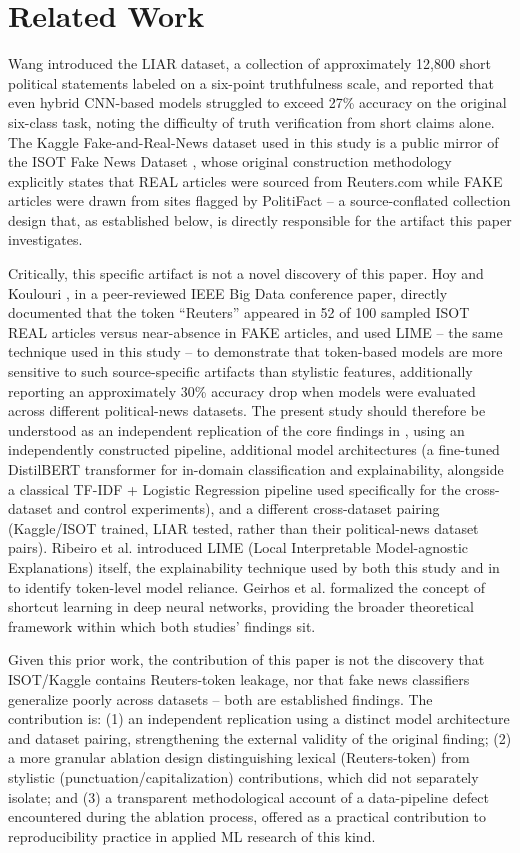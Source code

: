 \documentclass[conference]{IEEEtran}
\begin{document}
\section{Related Work}
Wang \cite{wang2017} introduced the LIAR dataset, a collection of approximately 12,800 short political statements labeled on a six-point truthfulness scale, and reported that even hybrid CNN-based models struggled to exceed 27\% accuracy on the original six-class task, noting the difficulty of truth verification from short claims alone. The Kaggle Fake-and-Real-News dataset used in this study is a public mirror of the ISOT Fake News Dataset \cite{ahmed2017}, whose original construction methodology explicitly states that REAL articles were sourced from Reuters.com while FAKE articles were drawn from sites flagged by PolitiFact -- a source-conflated collection design that, as established below, is directly responsible for the artifact this paper investigates.

Critically, this specific artifact is not a novel discovery of this paper. Hoy and Koulouri \cite{hoy2022}, in a peer-reviewed IEEE Big Data conference paper, directly documented that the token ``Reuters'' appeared in 52 of 100 sampled ISOT REAL articles versus near-absence in FAKE articles, and used LIME -- the same technique used in this study -- to demonstrate that token-based models are more sensitive to such source-specific artifacts than stylistic features, additionally reporting an approximately 30\% accuracy drop when models were evaluated across different political-news datasets. The present study should therefore be understood as an independent replication of the core findings in \cite{hoy2022}, using an independently constructed pipeline, additional model architectures (a fine-tuned DistilBERT transformer for in-domain classification and explainability, alongside a classical TF-IDF + Logistic Regression pipeline used specifically for the cross-dataset and control experiments), and a different cross-dataset pairing (Kaggle/ISOT trained, LIAR tested, rather than their political-news dataset pairs). Ribeiro et al. \cite{ribeiro2016} introduced LIME (Local Interpretable Model-agnostic Explanations) itself, the explainability technique used by both this study and in \cite{hoy2022} to identify token-level model reliance. Geirhos et al. \cite{geirhos2020} formalized the concept of shortcut learning in deep neural networks, providing the broader theoretical framework within which both studies' findings sit.

Given this prior work, the contribution of this paper is not the discovery that ISOT/Kaggle contains Reuters-token leakage, nor that fake news classifiers generalize poorly across datasets -- both are established findings. The contribution is: (1) an independent replication using a distinct model architecture and dataset pairing, strengthening the external validity of the original finding; (2) a more granular ablation design distinguishing lexical (Reuters-token) from stylistic (punctuation/capitalization) contributions, which \cite{hoy2022} did not separately isolate; and (3) a transparent methodological account of a data-pipeline defect encountered during the ablation process, offered as a practical contribution to reproducibility practice in applied ML research of this kind.
\end{document}
